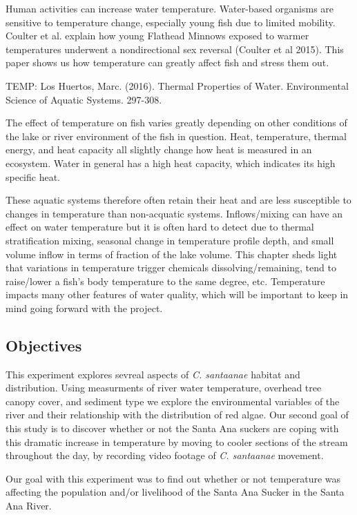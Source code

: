 \documentclass{article}
\begin{document}
Human activities can increase water temperature. Water-based organisms are sensitive to temperature change, especially young fish due to limited mobility. Coulter et al. explain how young Flathead Minnows exposed to warmer temperatures underwent a nondirectional sex reversal (Coulter et al 2015). This paper shows us how temperature can greatly affect fish and stress them out. 

TEMP:
Los Huertos, Marc. (2016). Thermal Properties of Water. Environmental Science of Aquatic Systems. 297-308.

The effect of temperature on fish varies greatly depending on other conditions of the lake or river environment of the fish in question.
Heat, temperature, thermal energy, and heat capacity all slightly change how heat is measured in an ecosystem. Water in general has a high heat capacity, which indicates its high specific heat. 

These aquatic systems therefore often retain their heat and are less susceptible to changes in temperature than non-acquatic systems. Inflows/mixing can have an effect on water temperature but it is often hard to detect due to thermal stratification mixing, seasonal change in temperature profile depth, and small volume inflow in terms of fraction of the lake volume. This chapter sheds light that variations in temperature trigger chemicals dissolving/remaining, tend to raise/lower a fish's body temperature to the same degree, etc. Temperature impacts many other features of water quality, which will be important to keep in mind going forward with the project.


\subsection{Objectives}
This experiment explores sevreal aspects of \emph{C. santaanae} habitat and distribution. Using measurments of river water temperature, overhead tree canopy cover, and sediment type we explore the environmental variables of the river and their relationship with the distribution of red algae. Our second goal of this study is to discover whether or not the Santa Ana suckers are coping with this dramatic increase in temperature by moving to cooler sections of the stream throughout the day, by recording video footage of \emph{C. santaanae} movement. 

Our goal with this experiment was to find out whether or not temperature was affecting the population and/or livelihood of the Santa Ana Sucker in the Santa Ana River.
\end{document}
